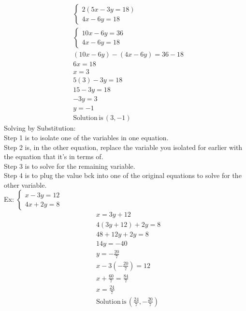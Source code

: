 \begin{align*}
    &\left\{\begin{matrix}
    2(5x-3y=18)\\
    4x-6y=18
    \end{matrix}\right.\\
    &\left\{\begin{matrix}
    10x-6y=36\\
    4x-6y=18
    \end{matrix}\right.\\
    &(10x-6y)-(4x-6y)=36-18\\
    &6x=18\\
    &x=3\\
    &5(3)-3y=18\\
    &15-3y=18\\
    &-3y=3\\
    &y=-1\\
    &\mathrm{Solution}\,\mathrm{is}\,(3,-1)
\end{align*}
Solving by Substitution:\\
Step 1 is to isolate one of the variables in one equation.\\
Step 2 is, in the other equation, replace the variable you isolated for earlier with the equation that it's in terms of.\\
Step 3 is to solve for the remaining variable.\\
Step 4 is to plug the value bck into one of the original equations to solve for the other variable.\\
Ex: $\left\{\begin{matrix} x-3y=12\\
4x+2y=8 \end{matrix}\right.$
\begin{align*}
    & x=3y+12\\
    &4(3y+12)+2y=8\\
    &48+12y+2y=8\\
    &14y=-40\\
    &y=-\frac{20}{7}\\
    &x-3\left(-\frac{20}{7}\right)=12\\
    &x+\frac{60}{7}=\frac{84}{7}\\
    &x=\frac{24}{7}\\
    &\mathrm{Solution}\,\mathrm{is}\,\left(\frac{24}{7},-\frac{20}{7}\right)
\end{align*}

